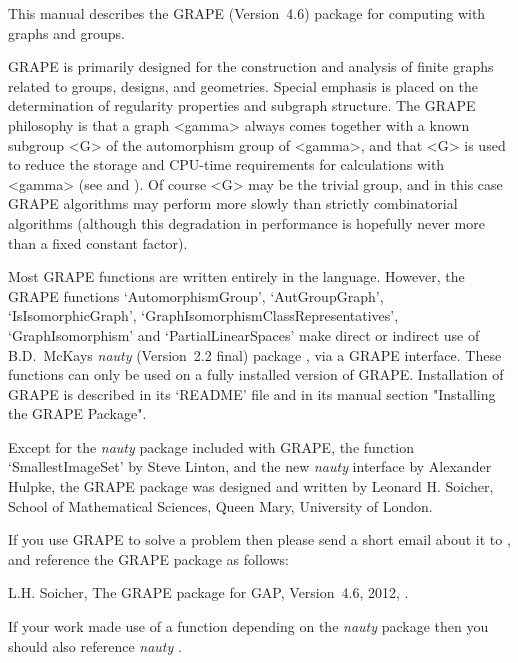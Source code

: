 %
%
%
%
\def\GRAPE{\sf GRAPE}
\def\nauty{\it nauty}
\def\Aut{{\rm Aut}\,} 


This manual describes the {\GRAPE} (Version~4.6) package for computing
with graphs and groups.

{\GRAPE} is primarily designed for the construction and analysis of
finite graphs related to groups, designs, and geometries. Special
emphasis is placed on the determination of regularity properties and
subgraph structure. The {\GRAPE} philosophy is that a graph <gamma>
always comes together with a known subgroup <G> of the automorphism
group of <gamma>, and that <G> is used to reduce the storage and
CPU-time requirements for calculations with <gamma> (see
\cite{Soi93} and \cite{Soi04}).  Of course <G> may be the trivial group,
and in this case {\GRAPE} algorithms may perform more slowly than strictly
combinatorial algorithms (although this degradation in performance is
hopefully never more than a fixed constant factor).

Most {\GRAPE} functions are written entirely in the {\GAP} language.
However, the {\GRAPE} functions `AutomorphismGroup', `AutGroupGraph',
`IsIsomorphicGraph', `GraphIsomorphismClassRepresentatives',
`GraphIsomorphism'  and `PartialLinearSpaces' make direct or indirect use
of B.D.~McKay{\pif}s {\nauty} (Version~2.2 final) package \cite{Nau90},
via a {\GRAPE} interface.  These functions can only be used on a fully
installed version of {\GRAPE}. Installation of {\GRAPE} is described
in its `README' file and in its manual section "Installing the GRAPE
Package".

Except for the {\nauty} package included with {\GRAPE}, the function
`SmallestImageSet' by Steve Linton, and the new {\nauty} interface
by Alexander Hulpke, the {\GRAPE} package was designed and written
by Leonard H. Soicher, School of Mathematical Sciences, Queen Mary,
University of London.

If you use {\GRAPE} to solve a problem then please send a short email
about it to , and reference the {\GRAPE} 
package as follows:

L.H. Soicher, The {GRAPE} package for {GAP}, Version~4.6, 2012,
.

If your work made use of a function depending on the {\nauty} package
then you should also reference {\nauty} \cite{Nau90}.

